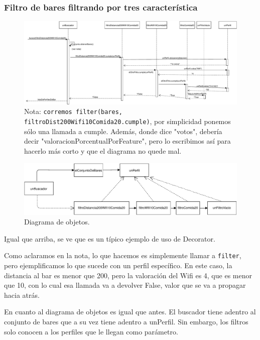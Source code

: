 \subsubsection{Filtro de bares filtrando por tres característica}

\begin{figure}[H]
  \centering
  \includegraphics[width=\textwidth]{diagramas/secuencia_3.pdf}
  \caption{\normalfont Nota: \texttt{corremos filter(bares, filtroDist200Wifi10Comida20.cumple)}, por simplicidad ponemos sólo una llamada a cumple.
Además, donde dice "votos", debería decir "valoracionPorcentualPorFeature", pero lo escribimos así para hacerlo más corto y que el diagrama no quede mal.
}
\end{figure}


\begin{figure}[H]
  \centering
  \includegraphics[width=\textwidth]{diagramas/objetos_3.pdf}
  \caption{\normalfont Diagrama de objetos.}
\end{figure}


Igual que arriba, se ve que es un típico ejemplo de uso de Decorator.

Como aclaramos en la nota, lo que hacemos es simplemente llamar a \texttt{filter}, pero ejemplificamos lo que sucede con un perfil específico. En este caso, la distancia al bar es menor que 200, pero la valoración del Wifi es 4, que es menor que 10, con lo cual esa llamada va a devolver False, valor que se va a propagar hacia atrás.

En cuanto al diagrama de objetos es igual que antes. El buscador tiene adentro al conjunto de bares que a su vez tiene adentro a unPerfil. Sin embargo, los filtros solo conocen a los perfiles que le llegan como parámetro.

